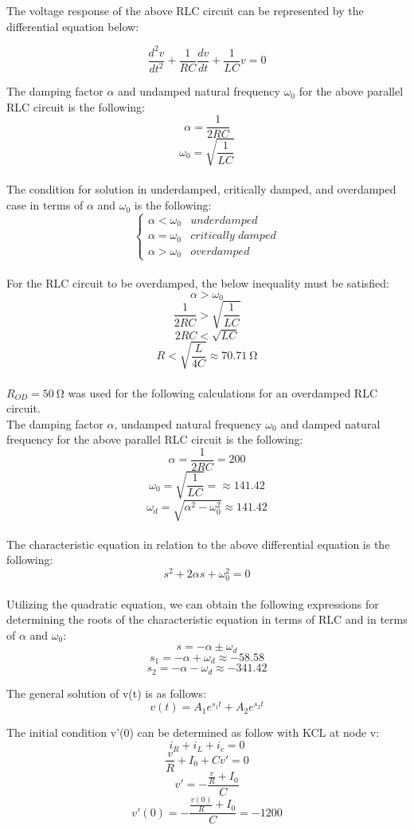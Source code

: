 \documentclass{article}
\begin{document}
The voltage response of the above RLC circuit can be represented by the differential equation below:

$$\frac{d^2v}{dt^2}+\frac{1}{RC}\frac{dv}{dt}+\frac{1}{LC}v=0$$

The damping factor $\alpha$ and undamped natural frequency $\omega_0$ for the above parallel RLC circuit is the following:
$$\alpha = \frac{1}{2RC}$$
$$\omega_0 = \sqrt{\frac{1}{LC}}$$\\

The condition for solution in underdamped, critically damped, and overdamped case in terms of $\alpha$ and $\omega_0$ is the following:
\[ \begin{cases} 
      \alpha < \omega_0 & underdamped \\
      \alpha = \omega_0 & critically\; damped \\
      \alpha > \omega_0 & overdamped 
   \end{cases}
\]\\

For the RLC circuit to be overdamped, the below inequality must be satisfied:
$$\alpha > \omega_0$$
$$\frac{1}{2RC}>\sqrt{\frac{1}{LC}}$$
$$2RC<\sqrt{LC}$$
$$R<\sqrt{\frac{L}{4C}}\approx\SI{70.71}{\ohm}$$\\

$R_{OD}=\SI{50}{\ohm}$ was used for the following calculations for an overdamped RLC circuit.\\

The damping factor $\alpha$, undamped natural frequency $\omega_0$ and damped natural frequency for the above parallel RLC circuit is the following:
$$\alpha = \frac{1}{2RC}=200$$
$$\omega_0 = \sqrt{\frac{1}{LC}}=\approx 141.42$$
$$\omega_d=\sqrt{\alpha^2-\omega_0^2}\approx 141.42$$\\

The characteristic equation in relation to the above differential equation is the following:
$$s^2+2\alpha s+\omega_0^2=0$$\\

Utilizing the quadratic equation, we can obtain the following expressions for determining the roots of the characteristic equation in terms of RLC and in terms of $\alpha$ and $\omega_0$:
$$s=-\alpha \pm\omega_d$$
$$s_1=-\alpha +\omega_d\approx-58.58$$
$$s_2=-\alpha -\omega_d\approx-341.42$$

The general solution of v(t) is as follows:
$$v(t)=A_1e^{s_1t}+A_2e^{s_2t}$$

The initial condition v'(0) can be determined as follow with KCL at node v:
$$i_R+i_L+i_c=0$$
$$\frac{v}{R}+I_0+Cv'=0$$
$$v'=-\frac{\frac{v}{R}+I_0}{C}$$
$$v'(0)=-\frac{\frac{v(0)}{R}+I_0}{C}=-1200$$\\
\end{document}
